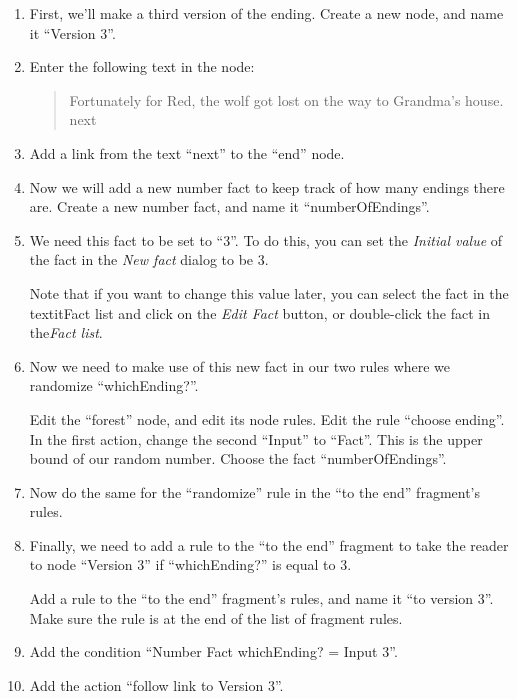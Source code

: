 \documentclass{article}
\begin{document}
\begin{enumerate}
    \item First, we'll make a third version of the ending. Create a new node, and name it ``Version 3''.
    \item Enter the following text in the node:
    
    \begin{quotation}
    \noindent Fortunately for Red, the wolf got lost on the way to Grandma's house.\\

    \noindent next
    \end{quotation}
    \item Add a link from the text ``next'' to the ``end'' node.
    \item Now we will add a new number fact to keep track of how many endings there are. Create a new number fact, and name it  ``numberOfEndings''.
    \item We need this fact to be set to ``3''. To do this, you can set the \textit{Initial value} of the fact in the \textit{New fact} dialog to be 3. 
    
Note that if you want to change this value later, you can select the fact in the textit{Fact list} and click on the \textit{Edit Fact} button, or double-click the fact in the\textit{Fact list}.
    \item Now we need to make use of this new fact in our two rules where we randomize ``whichEnding?''.
    
Edit the ``forest'' node, and edit its node rules. Edit the rule ``choose ending''. In the first action, change the second ``Input'' to ``Fact''. This is the upper bound of our random number. Choose the fact ``numberOfEndings''.
    \item Now do the same for the ``randomize'' rule in the ``to the end'' fragment's rules.
    \item Finally, we need to add a rule to the ``to the end'' fragment to take the reader to node ``Version 3'' if ``whichEnding?'' is equal to 3.
    
Add a rule to the ``to the end'' fragment's rules, and name it ``to version 3''. Make sure the rule is at the end of the list of fragment rules.
    \item Add the condition ``Number Fact whichEnding? = Input 3''.
    \item Add the action ``follow link to Version 3''.
\end{enumerate}
\end{document}
